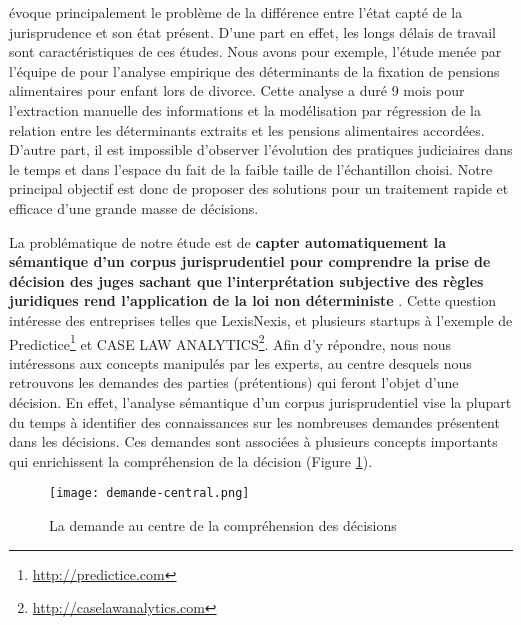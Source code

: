 \citet{ancel2003expulsion} évoque principalement le problème de la différence entre l'état capté de la jurisprudence et son état présent. D'une part en effet, les longs délais de travail sont caractéristiques de ces études. Nous avons pour exemple, l'étude menée  par l'équipe de \citet{jeandidier2006pensions} pour l'analyse empirique des déterminants de la fixation de pensions alimentaires pour enfant lors de divorce. Cette analyse a duré 9 mois pour l'extraction manuelle des informations et la modélisation par régression de la relation entre les déterminants extraits et les pensions alimentaires accordées.  D'autre part, il est impossible d'observer l'évolution des pratiques judiciaires dans le temps et dans l'espace du fait de la faible taille de l'échantillon choisi. Notre principal objectif est donc de proposer des solutions pour un traitement rapide et efficace d'une grande masse de décisions. 
 
 La problématique de notre étude est de \og \textbf{capter automatiquement la sémantique d'un corpus jurisprudentiel pour comprendre la prise de décision des juges sachant que l'interprétation subjective des règles juridiques rend l'application de la loi non déterministe} \fg{}. Cette question intéresse des entreprises telles que LexisNexis, et plusieurs startups  à l'exemple de Predictice\footnote{\url{http://predictice.com}} et CASE LAW ANALYTICS\footnote{\url{http://caselawanalytics.com}}. Afin d'y répondre, nous nous intéressons aux concepts manipulés par les experts, au centre desquels nous retrouvons les demandes des parties (prétentions) qui feront l'objet d'une décision. En effet, l'analyse sémantique d'un corpus jurisprudentiel vise  la plupart du temps à identifier des connaissances sur les nombreuses demandes présentent dans les décisions. Ces demandes sont associées à plusieurs concepts importants qui enrichissent la compréhension de la décision (Figure \ref{fig:intro:demande-central}).
 \begin{figure}[!htb]
 	\centering
 	\texttt{[image: demande-central.png]}
 	\caption{La demande au centre de la compréhension des décisions}
 	\label{fig:intro:demande-central}
 \end{figure} 

